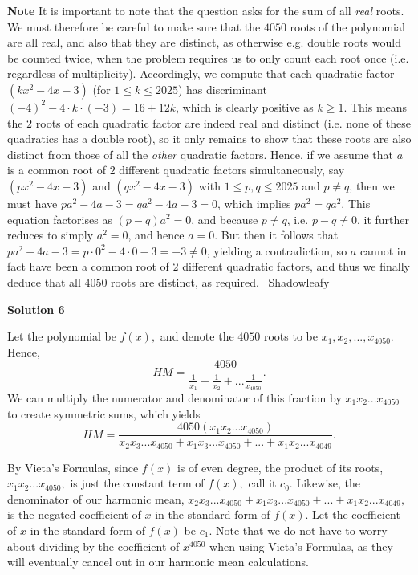 \begin{enumerate}
 \textbf{Note} It is important to note that the question asks for the sum of all \textit{real} roots. We must therefore be careful to make sure that the $4050$ roots of the polynomial are all real, and also that they are distinct, as otherwise e.g. double roots would be counted twice, when the problem requires us to only count each root once (i.e. regardless of multiplicity). Accordingly, we compute that each quadratic factor $\left(kx^2-4x-3\right)$ (for $1 \leq k \leq 2025$) has discriminant $(-4)^2-4 \cdot k \cdot (-3) = 16+12k$, which is clearly positive as $k \geq 1$. This means the $2$ roots of each quadratic factor are indeed real and distinct (i.e. none of these quadratics has a double root), so it only remains to show that these roots are also distinct from those of all the \textit{other} quadratic factors. Hence, if we assume that $a$ is a common root of $2$ different quadratic factors simultaneously, say $\left(px^2-4x-3\right)$ and $\left(qx^2-4x-3\right)$ with $1 \leq p,q \leq 2025$ and $p \neq q$, then we must have $pa^2-4a-3=qa^2-4a-3=0$, which implies $pa^2 = qa^2$. This equation factorises as $(p-q)a^2 = 0$, and because $p \neq q$, i.e. $p-q \neq 0$, it further reduces to simply $a^2 = 0$, and hence $a = 0$. But then it follows that $pa^2-4a-3 = p \cdot 0^2 - 4 \cdot 0 - 3 = -3 \neq 0$, yielding a contradiction, so $a$ cannot in fact have been a common root of $2$ different quadratic factors, and thus we finally deduce that all $4050$ roots are distinct, as required.~ Shadowleafy

 



\textbf{Solution 6}

Let the polynomial be $f(x),$ and denote the $4050$ roots to be $x_1,x_2,...,x_{4050}.$ Hence, 
 \[HM = \dfrac{4050}{\frac{1}{x_1}+\frac{1}{x_2}+...\frac{1}{x_{4050}}}.\]We can multiply the numerator and denominator of this fraction by $x_1x_2...x_{4050}$ to create symmetric sums, which yields 
 \[HM = \dfrac{4050(x_1x_2...x_{4050})}{x_2x_3...x_{4050}+x_1x_3...x_{4050}+...+x_1x_2...x_{4049}}.\]

 By Vieta's Formulas, since $f(x)$ is of even degree, the product of its roots, $x_1x_2...x_{4050},$ is just the constant term of $f(x),$ call it $c_0.$ Likewise, the denominator of our harmonic mean, $x_2x_3...x_{4050}+x_1x_3...x_{4050}+...+x_1x_2...x_{4049},$ is the negated coefficient of $x$ in the standard form of $f(x).$ Let the coefficient of $x$ in the standard form of $f(x)$ be $c_1.$ Note that we do not have to worry about dividing by the coefficient of $x^{4050}$ when using Vieta's Formulas, as they will eventually cancel out in our harmonic mean calculations.


\end{enumerate}
